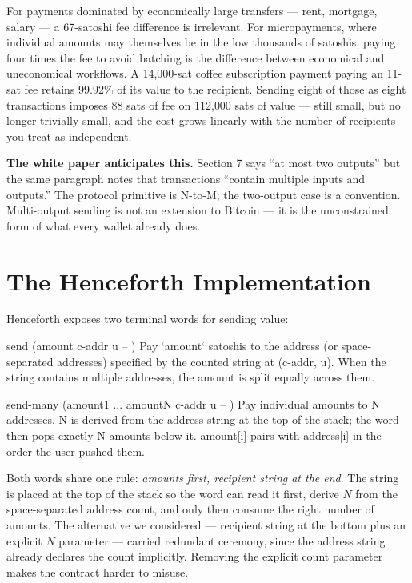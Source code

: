 \documentclass[a4paper, 11pt]{article}
\begin{document}
For payments dominated by economically large transfers --- rent, mortgage, salary --- a 67-satoshi fee difference is irrelevant. For micropayments, where individual amounts may themselves be in the low thousands of satoshis, paying four times the fee to avoid batching is the difference between economical and uneconomical workflows. A 14{,}000-sat coffee subscription payment paying an 11-sat fee retains 99.92\% of its value to the recipient. Sending eight of those as eight transactions imposes 88 sats of fee on 112{,}000 sats of value --- still small, but no longer trivially small, and the cost grows linearly with the number of recipients you treat as independent.

\begin{notebox}
\textbf{The white paper anticipates this.} Section 7 says ``at most two outputs'' but the same paragraph notes that transactions ``contain multiple inputs and outputs.'' The protocol primitive is N-to-M; the two-output case is a convention. Multi-output sending is not an extension to Bitcoin --- it is the unconstrained form of what every wallet already does.
\end{notebox}

\section{The Henceforth Implementation}

Henceforth exposes two terminal words for sending value:

\begin{forthbox}
  send         (amount c-addr u -- )
               Pay `amount` satoshis to the address (or
               space-separated addresses) specified by the
               counted string at (c-addr, u). When the string
               contains multiple addresses, the amount is split
               equally across them.

  send-many    (amount1 ... amountN c-addr u -- )
               Pay individual amounts to N addresses. N is
               derived from the address string at the top of
               the stack; the word then pops exactly N amounts
               below it. amount[i] pairs with address[i] in the
               order the user pushed them.
\end{forthbox}

Both words share one rule: \emph{amounts first, recipient string at the end}. The string is placed at the top of the stack so the word can read it first, derive $N$ from the space-separated address count, and only then consume the right number of amounts. The alternative we considered --- recipient string at the bottom plus an explicit $N$ parameter --- carried redundant ceremony, since the address string already declares the count implicitly. Removing the explicit count parameter makes the contract harder to misuse.
\end{document}

